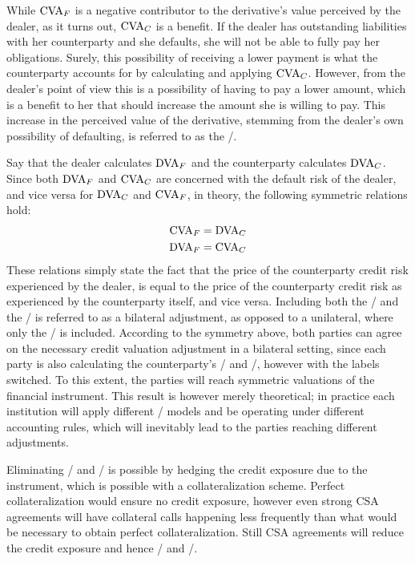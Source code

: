 \documentclass[main.tex]{subfiles}
\begin{document}
        While $\CVA/_{F}$ is a negative contributor to the derivative's value perceived by the dealer, 
        as it turns out, $\CVA/_{C}$ is a benefit.
        If the dealer has outstanding liabilities with her counterparty
        and she defaults, she will not be able to fully pay her obligations. 
        Surely, this possibility of receiving a lower payment is what the counterparty accounts for 
        by calculating and applying $\CVA/_{C}$.
        However, from the dealer's point of view this is a possibility of having to pay a lower amount,
        which is a benefit to her that should increase the amount she is willing to pay.
        This increase in the perceived value of the derivative, 
        stemming from the dealer's own possibility of defaulting, 
        is referred to as the \DVA/.

        Say that the dealer calculates $\DVA/_{F}$ and the counterparty calculates $\DVA/_{C}$.
        Since both $\DVA/_{F}$ and $\CVA/_{C}$ are concerned with the default risk of the dealer,
        and vice versa for $\DVA/_{C}$ and $\CVA/_{F}$, in theory, the following symmetric relations hold:
            \begin{align*}
                \CVA/_{F} &= \DVA/_{C} \\
                \DVA/_{F} &= \CVA/_{C}
            \end{align*}
        These relations simply state the fact that
        the price of the counterparty credit risk experienced by the dealer,
        is equal to the price of the counterparty credit risk as experienced by the counterparty itself, and vice versa.
        Including both the \CVA/ and the \DVA/ is referred to as a bilateral adjustment,
        as opposed to a unilateral, where only the \CVA/ is included.
        According to the symmetry above,
        both parties can agree on the necessary credit valuation adjustment in a bilateral setting,
        since each party is also calculating the counterparty's \CVA/ and \DVA/, however with the labels switched.
        To this extent, the parties will reach symmetric valuations of the financial instrument. 
        This result is however merely theoretical; 
        in practice each institution will apply different \CVA/ models
        and be operating under different accounting rules, 
        which will inevitably lead to the parties reaching different adjustments. 
        
        Eliminating \CVA/ and \DVA/ is possible by hedging the credit exposure due to the instrument,
        which is possible with a collateralization scheme. 
        Perfect collateralization would ensure no credit exposure,
        however even strong CSA agreements will have collateral calls happening less frequently
        than what would be necessary to obtain perfect collateralization.
        Still CSA agreements will reduce the credit exposure and hence \CVA/ and \DVA/.
\end{document}
